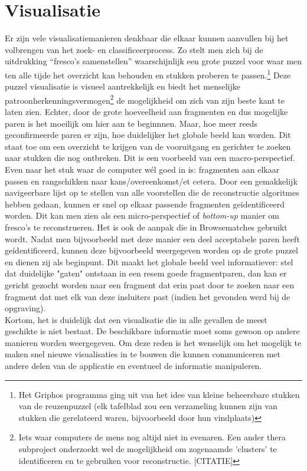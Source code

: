 \section{Visualisatie}
Er zijn vele visualisatiemanieren denkbaar die elkaar kunnen aanvullen bij het volbrengen van het zoek- en classificeerprocess. Zo stelt men zich bij de uitdrukking ``fresco's samenstellen'' waarschijnlijk een grote puzzel voor waar men ten alle tijde het overzicht kan behouden en stukken proberen te passen.\footnote{Het Griphos programma ging uit van het idee van kleine beheersbare stukken van de reuzenpuzzel (elk tafelblad zou een verzameling kunnen zijn van stukken die gerelateerd waren, bijvoorbeeld door hun vindplaats)} Deze puzzel visualisatie is visueel aantrekkelijk en biedt het menselijke patroonherkenningsvermogen\footnote{Iets waar computers de mens nog altijd niet in evenaren. Een ander thera subproject onderzoekt wel de mogelijkheid om zogenaamde 'clusters' te identificeren en te gebruiken voor reconstructie. [CITATIE]} de mogelijkheid om zich van zijn beste kant te laten zien. Echter, door de grote hoeveelheid aan fragmenten en dus mogelijke paren is het moeilijk om hier aan te beginnnen. Maar, hoe meer reeds geconfirmeerde paren er zijn, hoe duidelijker het globale beeld kan worden. Dit staat toe om een overzicht te krijgen van de vooruitgang en gerichter te zoeken naar stukken die nog ontbreken. Dit is een voorbeeld van een macro-perspectief.\\

Even naar het stuk waar de computer w\'el goed in is: fragmenten aan elkaar passen en rangschikken naar kans/overeenkomst/et cetera. Door een gemakkelijk navigeerbare lijst op te stellen van alle voorstellen die de reconstructie algoritmes hebben gedaan, kunnen er snel op elkaar passende fragmenten ge\"identificeerd worden. Dit kan men zien als een micro-perspectief of \emph{bottom-up} manier om fresco's te reconstrueren. Het is ook de aanpak die in Browsematches gebruikt wordt. Nadat men bijvoorbeeld met deze manier een deel acceptabele paren heeft ge\'identificeerd, kunnen deze bijvoorbeeld weergegeven worden op de grote puzzel en dienen zij als beginpunt. Dit maakt het globale beeld veel informatiever: stel dat duidelijke "gaten" ontstaan in een resem goede fragmentparen, dan kan er gericht gezocht worden naar een fragment dat erin past door te zoeken naar een fragment dat met elk van deze insluiters past (indien het gevonden werd bij de opgraving).\\

Kortom, het is duidelijk dat een visualisatie die in alle gevallen de meest geschikte is niet bestaat. De beschikbare informatie moet soms gewoon op andere manieren worden weergegeven. Om deze reden is het wenselijk om het mogelijk te maken snel nieuwe visualisaties in te bouwen die kunnen communiceren met andere delen van de applicatie en eventueel de informatie manipuleren. 
